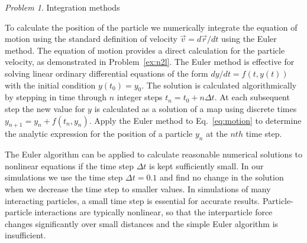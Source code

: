 \documentclass[preprint,showpacs,preprintnumbers,amsmath,amssymb,aps,prb]{revtex4-1}
\theoremstyle{remark}
\newtheorem{problem}{Problem}
\begin{document}
\begin{problem}{Integration methods}
  \label{ex:euler}

To calculate the position of the particle we
  numerically integrate the equation of motion using
  the standard definition of velocity
  $\vec{v} = d\vec{r}/dt$ 
  using the 
  Euler method. 
  The equation of motion provides
  a direct calculation for the particle velocity,
  as demonstrated in Problem~\ref{ex:n2l}.  
The Euler method is effective for solving linear ordinary differential  equations
  of the form
  $dy/dt = f(t,y(t))$ with the initial condition $y(t_0) = y_0$.
  The solution is calculated algorithmically
  by stepping in time through $n$ integer steps
  $t_n = t_0 + n \Delta t$.
  At each subsequent step the new
  value for $y$ is calculated as a  solution of a map using
  discrete times 
  $y_{n+1} = y_n + f(t_n,y_n)$.
  Apply the Euler method to %
  Eq.~\ref{eq:motion}
  to determine  the analytic expression
  for the position of a particle
  $y_n$ at the $nth$ time step.
    
  The Euler algorithm can be applied to
  calculate reasonable numerical solutions to 
  nonlinear
  equations if the time step $\Delta t$
  is kept sufficiently small.\cite{Newman}
  In our simulations we use the time step $\Delta t = 0.1$
  and find no change in the solution
  when we decrease the time step to smaller values.
  In simulations of
   many interacting particles,
  a small
  time step is essential for accurate results.
  Particle-particle interactions are typically nonlinear,
  so that the interparticle force changes significantly over small distances and the simple Euler algorithm is insufficient.
\end{problem}
\end{document}
